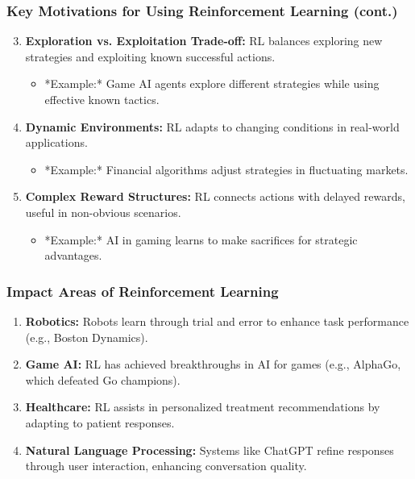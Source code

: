 \documentclass[aspectratio=169]{beamer}
\begin{document}
\begin{frame}[fragile]
    \frametitle{Key Motivations for Using Reinforcement Learning (cont.)}
    \begin{enumerate}
        \setcounter{enumi}{2}
        \item \textbf{Exploration vs. Exploitation Trade-off:} 
        RL balances exploring new strategies and exploiting known successful actions.
        \begin{itemize}
            \item *Example:* Game AI agents explore different strategies while using effective known tactics.
        \end{itemize}

        \item \textbf{Dynamic Environments:} 
        RL adapts to changing conditions in real-world applications.
        \begin{itemize}
            \item *Example:* Financial algorithms adjust strategies in fluctuating markets.
        \end{itemize}
        
        \item \textbf{Complex Reward Structures:} 
        RL connects actions with delayed rewards, useful in non-obvious scenarios.
        \begin{itemize}
            \item *Example:* AI in gaming learns to make sacrifices for strategic advantages.
        \end{itemize}
    \end{enumerate}
\end{frame}

\begin{frame}[fragile]
    \frametitle{Impact Areas of Reinforcement Learning}
    \begin{enumerate}
        \item \textbf{Robotics:} 
        Robots learn through trial and error to enhance task performance (e.g., Boston Dynamics).
        
        \item \textbf{Game AI:} 
        RL has achieved breakthroughs in AI for games (e.g., AlphaGo, which defeated Go champions).
        
        \item \textbf{Healthcare:} 
        RL assists in personalized treatment recommendations by adapting to patient responses.
        
        \item \textbf{Natural Language Processing:} 
        Systems like ChatGPT refine responses through user interaction, enhancing conversation quality.
    \end{enumerate}
\end{frame}
\end{document}
